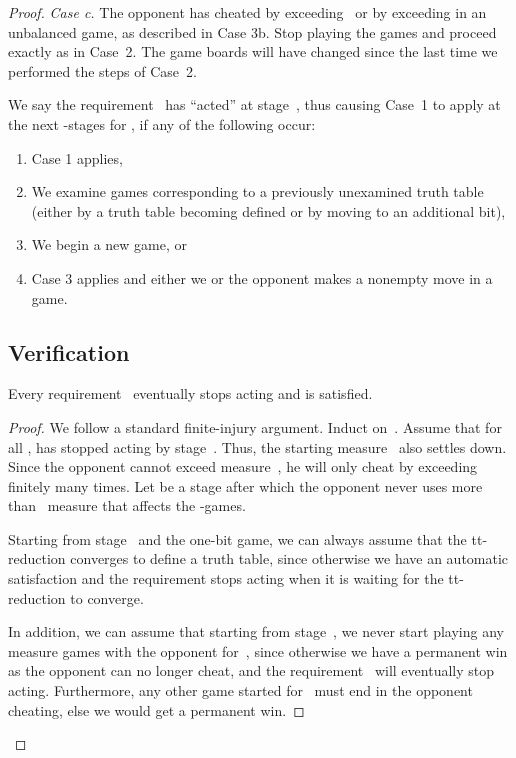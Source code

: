 \documentclass{LMCS}
\newcommand{\0}{\mathbf{0}}
\newcommand{\<}{\langle}
\renewcommand{\>}{\rangle}
\begin{document}
\begin{proof}
\smallskip
{\em Case c.} The opponent has cheated by exceeding~ or by
exceeding  in an unbalanced game, as described in Case
3b. Stop playing the games and proceed exactly as in Case~2. The game boards
will have changed since the last time we performed the steps of Case~2.

\begin{rem}\label{rem-acted}
We say the requirement~ has ``acted'' at stage~, thus
causing Case~1 to apply at the next -stages for , if any of the
following occur:
\begin{enumerate}[label=(\roman*)]
\item Case 1 applies,
\item We examine games corresponding to a previously unexamined
    truth table (either by a truth table becoming defined or by moving to
    an additional bit),
\item We begin a new game, or
\item Case 3 applies and either we or the opponent makes a nonempty
    move in a game.
\end{enumerate}
\end{rem}


\subsection{Verification}

\begin{lem}
Every requirement~ eventually stops acting and is satisfied.
\end{lem}

\begin{proof}
We follow a standard finite-injury argument. Induct on~. Assume that for
all ,  has stopped acting by stage~. Thus, the
starting measure~ also settles down. Since the opponent cannot
exceed measure~, he will only cheat by exceeding~ finitely
many times. Let  be a stage after which the opponent never uses more
than~ measure that affects the -games.

Starting from stage~ and the one-bit game, we can always assume that the
tt-reduction converges to define a truth table, since otherwise we have an
automatic satisfaction and the requirement stops acting when it is waiting
for the tt-reduction to converge.

In addition, we can assume that starting from stage~, we never start
playing any~ measure games with the opponent for~,
since otherwise we have a permanent win as the opponent can no longer cheat,
and the requirement~ will eventually stop acting. Furthermore,
any other game started for~ must end in the opponent cheating,
else we would get a permanent win.


\end{proof}
\end{proof}
\end{document}
